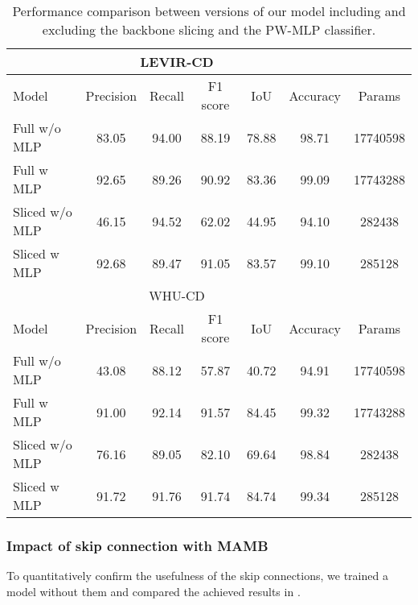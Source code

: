 \begin{table}[!ht]
    \caption{
        Performance comparison between versions of our model including and excluding the backbone slicing and the PW-MLP classifier.
    }
    \centering
    \begin{tabular}{l|ccccc|c}
        \hline
        \multicolumn{6}{c}{LEVIR-CD}\\
    \hline
        Model & Precision & Recall & F1 score & IoU & Accuracy & Params \\ 
        \hline
        Full w/o MLP & 83.05 & 94.00 & 88.19 & 78.88 & 98.71 & 17740598 \\ 
        Full w MLP & 92.65 & 89.26 & 90.92 & 83.36 & 99.09 & 17743288 \\ 
        Sliced w/o MLP & 46.15 & 94.52 & 62.02 & 44.95 & 94.10 & 282438 \\ 
        Sliced w MLP & 92.68 & 89.47 & 91.05 & 83.57 & 99.10 & 285128 \\ 
    \hline
        \multicolumn{6}{c}{WHU-CD}\\
        \hline
        Model & Precision & Recall & F1 score & IoU & Accuracy & Params \\ 
        \hline
        Full w/o MLP & 43.08 & 88.12 & 57.87 & 40.72 & 94.91 & 17740598 \\ 
        Full w MLP & 91.00 & 92.14 & 91.57 & 84.45 & 99.32 & 17743288 \\ 
        Sliced w/o MLP & 76.16 & 89.05 & 82.10 & 69.64 & 98.84 & 282438 \\ 
        Sliced w MLP & 91.72 & 91.76 & 91.74 & 84.74 & 99.34 & 285128 \\ 
        \hline
    \end{tabular}
    \label{tab:backbonemlp}
\end{table}


\subsubsection{Impact of skip connection with MAMB}

To quantitatively confirm the usefulness of the skip connections, we trained a model without them 
and compared the achieved results in . 

